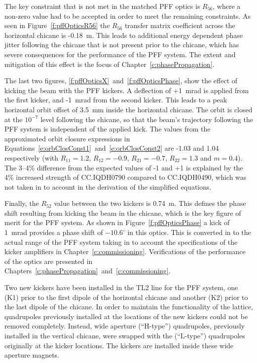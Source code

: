 The key constraint that is not met in the matched PFF optics is \(R_{56}\), where a non-zero value had to be accepted in order to meet the remaining constraints. As seen in Figure~\ref{f:pffOpticsR56} the \(R_{56}\) transfer matrix coefficient across the horizontal chicane is -0.18~m. This leads to additional energy dependent phase jitter following the chicane that is not present prior to the chicane, which has severe consequences for the performance of the PFF system. The extent and mitigation of this effect is the focus of Chapter~\ref{c:phasePropagation}.

The last two figures, \ref{f:pffOpticsX}~and~\ref{f:pffOpticsPhase}, show the effect of kicking the beam with the PFF kickers. A deflection of +1~mrad is applied from the first kicker, and -1~mrad from the second kicker. This leads to a peak horizontal orbit offset of 3.5~mm inside the horizontal chicane. The orbit is closed at the \(10^{-7}\) level following the chicane, so that the beam's trajectory following the PFF system is independent of the applied kick. The values from the approximated orbit closure expressions in Equations~\ref{e:orbClosConst1}~and~\ref{e:orbClosConst2} are -1.03 and 1.04 respectively (with \(R_{11} = 1.2\), \(R_{12} = -0.9\), \(R_{21} = -0.7\), \(R_{22} = 1.3\) and \(m = 0.4\)). The 3--4\% difference from the expected values of -1 and +1 is explained by the 4\% increased strength of CC.IQDH0790 compared to CC.IQDH0490, which was not taken in to account in the derivation of the simplified equations.

Finally, the \(R_{52}\) value between the two kickers is 0.74~m. This defines the phase shift resulting from kicking the beam in the chicane, which is the key figure of merit for the PFF system. As shown in Figure~\ref{f:pffOpticsPhase} a kick of 1~mrad provides a phase shift of \(-10.6^\circ\) in this optics. This is converted in to the actual range of the PFF system taking in to account the specifications of the kicker amplifiers in Chapter~\ref{c:commissioning}. Verifications of the performance of the optics are presented in Chapters~\ref{c:phasePropagation}~and~\ref{c:commissioning}.




Two new kickers have been installed in the TL2 line for the PFF system, one (K1) prior to the first dipole of the horizontal chicane and another (K2) prior to the last dipole of the chicane. In order to maintain the functionality of the lattice, quadrupoles previously installed at the locations of the new kickers could not be removed completely.
Instead, wide aperture (``H-type'') quadrupoles, previously installed in the vertical chicane, were swapped with the (``L-type'') quadrupoles originally at the kicker locations. The kickers are installed inside these wide aperture magnets.

